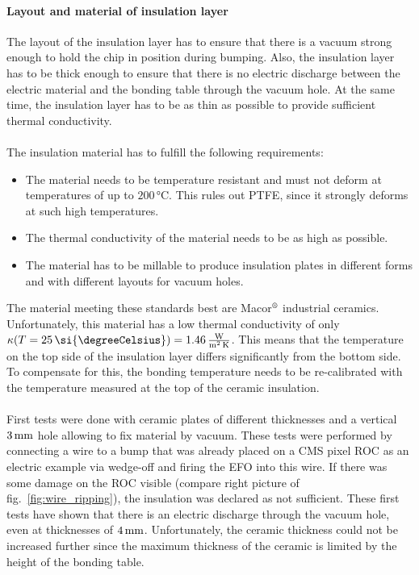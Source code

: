 \paragraph*{Layout and material of insulation layer}
The layout of the insulation layer has to ensure that there is a vacuum strong enough to hold the chip in position during bumping. Also, the insulation layer has to be thick enough to ensure that there is no electric discharge between the electric material and the bonding table through the vacuum hole. At the same time, the insulation layer has to be as thin as possible to provide sufficient thermal conductivity.
\\
\\
The insulation material has to fulfill the following requirements:
\begin{itemize}
\item The material needs to be temperature resistant and must not deform at temperatures of up to $200\,\si{\degreeCelsius}$. This rules out \ac{PTFE}, since it strongly deforms at such high temperatures.
\item The thermal conductivity of the material needs to be as high as possible.
\item The material has to be millable to produce insulation plates in different forms and with different layouts for vacuum holes.
\end{itemize}
The material meeting these standards best are Macor$\rm{\symbR}$ industrial ceramics. Unfortunately, this material has a low thermal conductivity of only $\kappa (T=25\, \si{\degreeCelsius})=1.46\,\frac{\rm{W}}{\rm{m^2\,K}}$. This means that the temperature on the top side of the insulation layer differs significantly from the bottom side. To compensate for this, the bonding temperature needs to be re-calibrated with the temperature measured at the top of the ceramic insulation.\\
\\First tests were done with ceramic plates of different thicknesses and a vertical $3\,\rm{mm}$ hole allowing to fix material by vacuum. These tests were performed by connecting a wire to a bump that was already placed on a \ac{CMS} pixel \acs{ROC} as an electric example via wedge-off and firing the \ac{EFO} into this wire. If there was some damage on the \acs{ROC} visible (compare right picture of fig.~\ref{fig:wire_ripping}), the insulation was declared as not sufficient. These first tests have shown that there is an electric discharge through the vacuum hole, even at thicknesses of $4\,\rm{mm}$. Unfortunately, the ceramic thickness could not be increased further since the maximum thickness of the ceramic is limited by the height of the bonding table.

